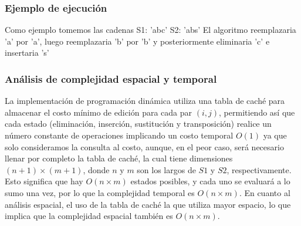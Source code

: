 \subsubsection{Ejemplo de ejecución}
    Como ejemplo tomemos las cadenas
    S1: 'abc'
    S2: 'abs'
    El algoritmo reemplazaria 'a' por 'a', luego reemplazaria 'b' por 'b' y posteriormente eliminaria 'c' e insertaria 's'
\subsubsection{Análisis de complejidad espacial y temporal}

    La implementación de programación dinámica utiliza una tabla de caché para almacenar el costo mínimo de edición para cada par $(i,j)$, permitiendo así que cada estado (eliminación, 
    inserción, sustitución y transposición) realice un número constante de operaciones implicando un costo temporal $O(1)$ ya que solo consideramos la consulta al costo, aunque, en el peor caso, será necesario llenar por completo la tabla de caché, la cual tiene 
    dimensiones $(n+1) \times (m+1)$, donde $n$ y $m$ son los largos de $S1$ y $S2$, respectivamente. Esto significa que hay \(O(n \times m)\) estados posibles, y cada uno se evaluará a lo sumo una vez, 
    por lo que la complejidad temporal es \(O(n \times m)\). En cuanto al análisis espacial, el uso de la tabla de caché la que utiliza mayor espacio, lo que 
    implica que la complejidad espacial también es \(O(n \times m)\).
